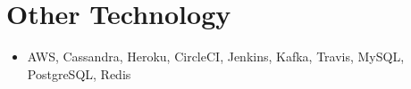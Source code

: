 \documentclass[letterpaper,11pt]{article}
\newcommand{\resumeItemNoBold}[1]{
  \item\small{
    {#1 \vspace{-2pt}}
  }
}
\newcommand{\resumeSubHeadingListStart}{\begin{itemize}[leftmargin=*]}
\newcommand{\resumeSubHeadingListEnd}{\end{itemize}}
\begin{document}
\section{Other Technology}
  \resumeSubHeadingListStart
    \resumeItemNoBold{AWS, Cassandra, Heroku, CircleCI, Jenkins, Kafka, Travis,
    MySQL, PostgreSQL, Redis}
  \resumeSubHeadingListEnd

\end{document}
